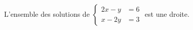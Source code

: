 L'ensemble des solutions de $\begin{cases}2x-y &= 6 \\ x-2y &= 3\end{cases}$ est une droite.

\begin{reponses}
\end{reponses}

